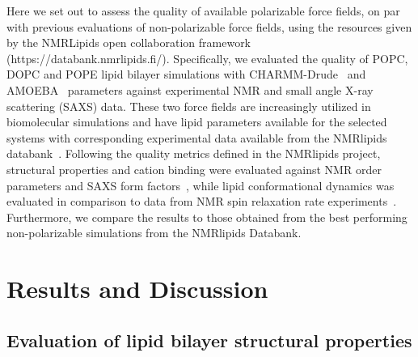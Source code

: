 \documentclass[journal=jacsat,manuscript=article,layout=singlecolumn]{achemso}
\begin{document}
Here we set out to assess the quality of available polarizable force fields, on par with previous evaluations of non-polarizable force fields, using the resources given by the NMRLipids open collaboration framework (https://databank.nmrlipids.fi/). Specifically, we evaluated the quality of POPC, DOPC and POPE lipid bilayer simulations with CHARMM-Drude~\cite{li2017drude,yu2023drude} and AMOEBA~\cite{chu2018anionicpolarizable,chu2018polarizable} parameters against experimental NMR and small angle X-ray scattering (SAXS) data. These two force fields are increasingly utilized in biomolecular simulations and have lipid parameters available for the selected systems with corresponding experimental data available from the NMRlipids databank~\cite{Databank}. Following the quality metrics defined in the NMRlipids project, structural properties and cation binding were evaluated against NMR order parameters and SAXS form factors~\cite{Botan2015,ollila16,Catte2016,Databank}, while lipid conformational dynamics was evaluated in comparison to data from NMR spin relaxation rate experiments~\cite{ferreira15,Antila2021}. 
Furthermore, we compare the results to those obtained from the best performing non-polarizable simulations from the NMRlipids Databank\cite{Databank}. 






 



 
\section{Results and Discussion}

\subsection{Evaluation of lipid bilayer structural properties}
\end{document}
